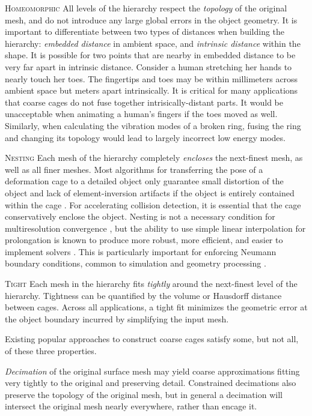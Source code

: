 \noindent \textsc{Homeomorphic} All levels of the hierarchy respect the
\emph{topology} of the original mesh, and do not introduce any large global
errors in the object geometry. It is important to differentiate between two
types of distances when building the hierarchy: \emph{embedded distance} in
ambient space, and \emph{intrinsic distance} within the shape.
%
It is possible for two points that are nearby in embedded distance to be very
far apart in intrinsic distance. Consider a human stretching her hands to
nearly touch her toes. The fingertips and toes may be within millimeters across
ambient space but meters apart intrinsically.
%
It is critical for many applications that coarse cages do not fuse together
intrisically-distant parts. It would be unacceptable when animating a 
human's fingers if the toes moved as well.
%
Similarly, when calculating the vibration modes of a broken ring, fusing the
ring and changing its topology would lead to largely incorrect low energy
modes.

\noindent \textsc{Nesting}
%
Each mesh of the hierarchy completely \emph{encloses} the next-finest mesh, as
well as all finer meshes.
%
Most algorithms for transferring the pose of a deformation cage to a detailed
object only guarantee small distortion of the object and lack of
element-inversion artifacts if the object is entirely contained within the cage
\cite{HarmonicCoodinates07,Ben-Chen:2009:VHM}.
%
For accelerating collision detection, it is essential that the cage
conservatively enclose the object.
%
Nesting is not a necessary condition for multiresolution convergence
\cite{Chan96overlappingschwarz}, but the ability to use simple linear interpolation
for prolongation is known to produce more robust, more
efficient, and easier to implement solvers
\cite{chan2000robust,dickopf2010multilevel}.
%
This is particularly important for enforcing Neumann boundary conditions,
common to simulation and geometry processing \cite{chan1999boundary}.

\noindent \textsc{Tight}
%
Each mesh in the hierarchy fits \emph{tightly} around the next-finest level of
the hierarchy.
%
Tightness can be quantified by the volume or Hausdorff distance between cages.
%
Across all applications, a tight fit minimizes the geometric error at the
object boundary incurred by simplifying the input mesh.

Existing popular approaches to construct coarse cages satisfy some, but not
all, of these three properties.

\emph{Decimation} of the original surface mesh may yield coarse
approximations fitting very tightly to the original and preserving detail.
%
Constrained decimations also preserve the topology of the original mesh, but in
general a decimation will intersect the original mesh nearly everywhere, rather
than encage it.


